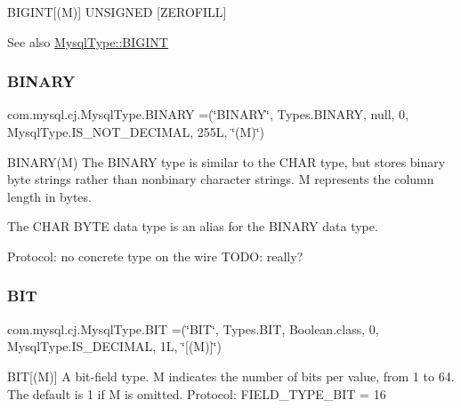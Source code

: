 B\+I\+G\+I\+NT\mbox{[}(M)\mbox{]} U\+N\+S\+I\+G\+N\+ED \mbox{[}Z\+E\+R\+O\+F\+I\+LL\mbox{]}

\begin{DoxySeeAlso}{See also}
\mbox{\hyperlink{enumcom_1_1mysql_1_1cj_1_1_mysql_type_a5e0b78b90c1ad86e03b108c01d729118}{Mysql\+Type\+::\+B\+I\+G\+I\+NT}} 
\end{DoxySeeAlso}
\mbox{\label{enumcom_1_1mysql_1_1cj_1_1_mysql_type_ac5a30a348c2d7efaefa81040b53513a7}} 
\subsubsection{\texorpdfstring{B\+I\+N\+A\+RY}{BINARY}}
{\footnotesize\ttfamily com.\+mysql.\+cj.\+Mysql\+Type.\+B\+I\+N\+A\+RY =(\char`\"{}B\+I\+N\+A\+RY\char`\"{}, Types.\+B\+I\+N\+A\+RY, null, 0, Mysql\+Type.\+I\+S\+\_\+\+N\+O\+T\+\_\+\+D\+E\+C\+I\+M\+AL, 255\+L, \char`\"{}(\+M)\char`\"{})}

B\+I\+N\+A\+R\+Y(\+M) The B\+I\+N\+A\+RY type is similar to the C\+H\+AR type, but stores binary byte strings rather than nonbinary character strings. M represents the column length in bytes.

The C\+H\+AR B\+Y\+TE data type is an alias for the B\+I\+N\+A\+RY data type.

Protocol\+: no concrete type on the wire T\+O\+DO\+: really? \mbox{\label{enumcom_1_1mysql_1_1cj_1_1_mysql_type_aec2c26d184d9541cf9ba34c0325d0b18}} 
\subsubsection{\texorpdfstring{B\+IT}{BIT}}
{\footnotesize\ttfamily com.\+mysql.\+cj.\+Mysql\+Type.\+B\+IT =(\char`\"{}B\+IT\char`\"{}, Types.\+B\+IT, Boolean.\+class, 0, Mysql\+Type.\+I\+S\+\_\+\+D\+E\+C\+I\+M\+AL, 1\+L, \char`\"{}\mbox{[}(\+M)\mbox{]}\char`\"{})}

B\+IT\mbox{[}(M)\mbox{]} A bit-\/field type. M indicates the number of bits per value, from 1 to 64. The default is 1 if M is omitted. Protocol\+: F\+I\+E\+L\+D\+\_\+\+T\+Y\+P\+E\+\_\+\+B\+IT = 16 \mbox{\label{enumcom_1_1mysql_1_1cj_1_1_mysql_type_ab5c20c6e73cfab558b68240c5087aa47}} 
